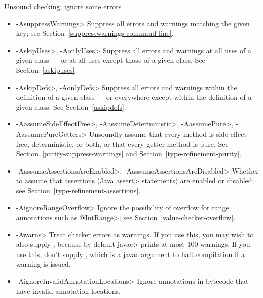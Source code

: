 Unsound checking: ignore some errors
\begin{itemize}
\item \<-AsuppressWarnings>
  Suppress all errors and warnings matching the given key; see
  Section~\ref{suppresswarnings-command-line}.
\item \<-AskipUses>, \<-AonlyUses>
  Suppress all errors and warnings at all uses of a given class --- or at all
  uses except those of a given class.  See Section~\ref{askipuses}.
\item \<-AskipDefs>, \<-AonlyDefs>
  Suppress all errors and warnings within the definition of a given class
  --- or everywhere except within the definition of a given class.  See
  Section~\ref{askipdefs}.
\item \<-AassumeSideEffectFree>, \<-AassumeDeterministic>, \<-AassumePure>, \<-AassumePureGetters>
  Unsoundly assume that every method is side-effect-free, deterministic, or
  both; or that every getter method is pure.
  See Section~\ref{purity-suppress-warnings} and
  Section~\ref{type-refinement-purity}.
\item \<-AassumeAssertionsAreEnabled>, \<-AassumeAssertionsAreDisabled>
  Whether to assume that assertions (Java \<assert> statements) are enabled
  or disabled; see Section~\ref{type-refinement-assertions}.
\item \<-AignoreRangeOverflow>
  Ignore the possibility of overflow for range annotations such as
  \<@IntRange>; see Section~\ref{value-checker-overflow}.
\item \<-Awarns>
  Treat checker errors as warnings.  If you use this, you may wish to also
  supply , because by default \<javac> prints at
  most 100 warnings.  If you use this, don't supply ,
  which is a javac argument to halt compilation if a warning is issued.
\item \<-AignoreInvalidAnnotationLocations>
  Ignore annotations in bytecode that have invalid annotation locations.
\end{itemize}

